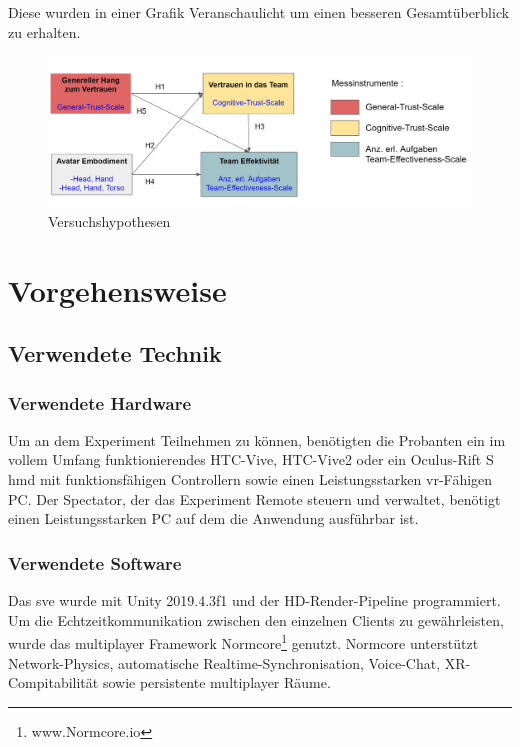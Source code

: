 \documentclass[a4paper,11pt]{article}%
\renewcommand{\\}{\vspace*{0.5\baselineskip} \newline}
\begin{document}
Diese wurden in einer Grafik Veranschaulicht um einen besseren Gesamtüberblick zu erhalten.

\begin{figure}[H]
		\begin{footnotesize}
			\includegraphics[width=\textwidth]{Abbildungen/Versuchshypothesen.JPG}\\
			\caption{Versuchshypothesen}
			\label{Versuchshypothesen}
		\end{footnotesize}
	\end{figure}	

		
	\section{Vorgehensweise}
		\subsection{Verwendete Technik}
			\subsubsection{Verwendete Hardware}
Um an dem Experiment Teilnehmen zu können, benötigten die Probanten ein im vollem Umfang funktionierendes HTC-Vive, HTC-Vive2 oder ein Oculus-Rift S \ac{hmd} mit funktionsfähigen Controllern sowie einen Leistungsstarken \ac{vr}-Fähigen PC. Der Spectator, der das Experiment Remote steuern und verwaltet, benötigt einen Leistungsstarken PC auf dem die Anwendung ausführbar ist.

			\subsubsection{Verwendete Software}
Das \ac{sve} wurde mit Unity 2019.4.3f1 und der HD-Render-Pipeline programmiert. Um die Echtzeitkommunikation zwischen den einzelnen Clients zu gewährleisten, wurde das multiplayer Framework \flqq Normcore\frqq \footnote{www.Normcore.io} genutzt.
Normcore unterstützt Network-Physics, automatische Realtime-Synchronisation, Voice-Chat, XR-Compitabilität sowie persistente multiplayer Räume.
\end{document}
